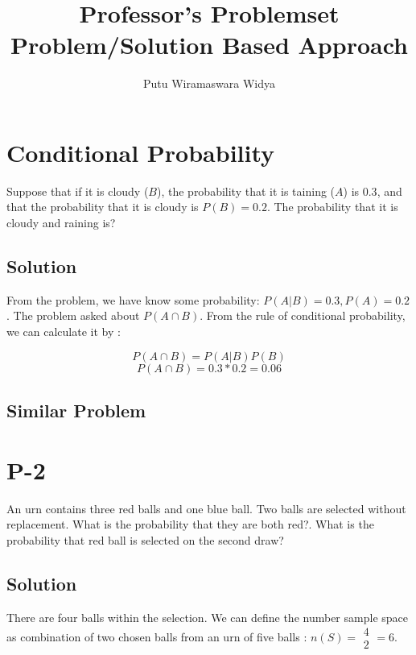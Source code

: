 \documentclass[12pt,a4paper]{article}
\begin{document}
\title {Professor's Problemset\\ Problem/Solution Based Approach}
\author {Putu Wiramaswara Widya}
	
\maketitle

\section{Conditional Probability}

Suppose  that if it is cloudy ($B$), the probability that it is taining ($A$) is $0.3$, and that the probability that it is cloudy is $P(B) = 0.2$. The probability that it is cloudy and raining is?

\subsection{Solution}

From the problem, we have know some probability: $P(A|B) = 0.3, P(A) = 0.2$. The problem asked about $P(A \cap B)$. From the rule of conditional probability, we can calculate it by : 

\[
    P(A \cap B) = P(A|B) P(B)
\]
\[
    P(A \cap B) = 0.3 * 0.2 = 0.06
\]
\subsection{Similar Problem}

\section{P-2}

An urn contains three red balls and one blue ball. Two balls are selected without replacement. What is the probability that they are both red?. What is the probability that red ball is selected on the second draw?

\subsection{Solution}

There are four balls within the selection. We can define the number sample space as combination of two chosen balls from an urn of five balls : $n(S) = \begin{array}{c}4\\2\end{array} = 6$.
\end{document}
